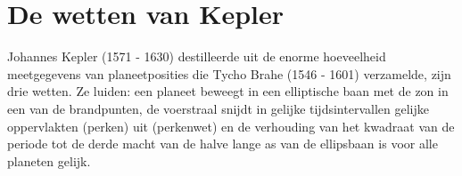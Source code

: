 \documentclass{ximera}
\begin{document}
	\author{Bart Lambregs}
    \xmsource

	
\section{De wetten van Kepler}

Johannes Kepler (1571 - 1630) destilleerde uit de enorme hoeveelheid meetgegevens van planeetposities die Tycho Brahe (1546 - 1601) verzamelde, zijn drie wetten. Ze luiden: een planeet beweegt in een elliptische baan met de zon in een van de brandpunten, de voerstraal snijdt in gelijke tijdsintervallen gelijke oppervlakten (perken) uit (perkenwet) en de verhouding van het kwadraat van de periode tot de derde macht van de halve lange as van de ellipsbaan is voor alle planeten gelijk.
	
	
\end{document}
